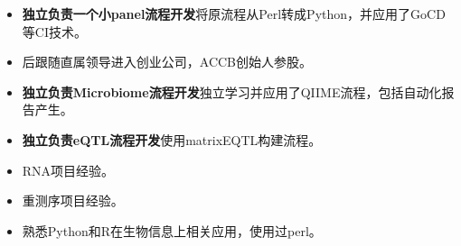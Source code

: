 \documentclass{resume}
\begin{document}
\begin{itemize}
  \item \textbf{独立负责一个小panel流程开发}将原流程从Perl转成Python，并应用了GoCD等CI技术。
  \item 后跟随直属领导进入创业公司，ACCB创始人参股。
\end{itemize}

\begin{itemize}
  \item \textbf{独立负责Microbiome流程开发}独立学习并应用了QIIME流程，包括自动化报告产生。
\end{itemize}

\begin{itemize}
  \item \textbf{独立负责eQTL流程开发}使用matrixEQTL构建流程。
  \item RNA项目经验。
  \item 重测序项目经验。
  \item 熟悉Python和R在生物信息上相关应用，使用过perl。
\end{itemize}



\end{document}
